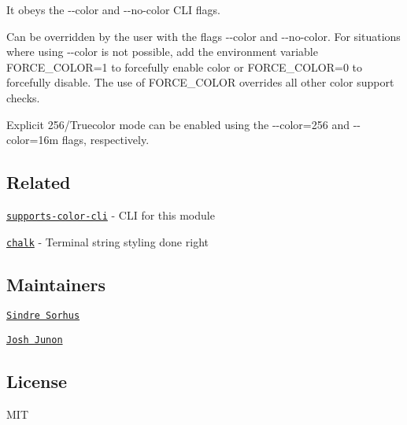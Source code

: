 It obeys the {\ttfamily -\/-\/color} and {\ttfamily -\/-\/no-\/color} C\+LI flags.

Can be overridden by the user with the flags {\ttfamily -\/-\/color} and {\ttfamily -\/-\/no-\/color}. For situations where using {\ttfamily -\/-\/color} is not possible, add the environment variable {\ttfamily F\+O\+R\+C\+E\+\_\+\+C\+O\+L\+OR=1} to forcefully enable color or {\ttfamily F\+O\+R\+C\+E\+\_\+\+C\+O\+L\+OR=0} to forcefully disable. The use of {\ttfamily F\+O\+R\+C\+E\+\_\+\+C\+O\+L\+OR} overrides all other color support checks.

Explicit 256/\+Truecolor mode can be enabled using the {\ttfamily -\/-\/color=256} and {\ttfamily -\/-\/color=16m} flags, respectively.

\subsection*{Related}


\begin{DoxyItemize}
\item \href{https://github.com/chalk/supports-color-cli}{\tt supports-\/color-\/cli} -\/ C\+LI for this module
\item \href{https://github.com/chalk/chalk}{\tt chalk} -\/ Terminal string styling done right
\end{DoxyItemize}

\subsection*{Maintainers}


\begin{DoxyItemize}
\item \href{https://github.com/sindresorhus}{\tt Sindre Sorhus}
\item \href{https://github.com/qix-}{\tt Josh Junon}
\end{DoxyItemize}

\subsection*{License}

M\+IT 
